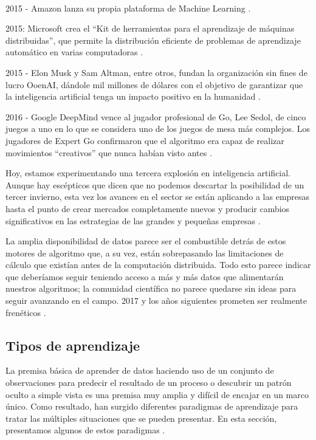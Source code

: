 \\ \par
2015 - Amazon lanza su propia plataforma de Machine Learning \cite{V.Gonzalez}.
\\ \par
2015: Microsoft crea el ``Kit de herramientas para el aprendizaje de máquinas distribuidas'', que permite la distribución eficiente de problemas de aprendizaje automático en varias computadoras \cite{V.Gonzalez}.
\\ \par
2015 - Elon Musk y Sam Altman, entre otros, fundan la organización sin fines de lucro OoenAI, dándole mil millones de dólares con el objetivo de garantizar que la inteligencia artificial tenga un impacto positivo en la humanidad \cite{V.Gonzalez}.
\\ \par
2016 - Google DeepMind vence al jugador profesional de Go, Lee Sedol, de cinco juegos a uno en lo que se considera uno de los juegos de mesa más complejos. Los jugadores de Expert Go confirmaron que el algoritmo era capaz de realizar movimientos ``creativos'' que nunca habían visto antes \cite{V.Gonzalez}.
\\ \par
Hoy, estamos experimentando una tercera explosión en inteligencia artificial. Aunque hay escépticos que dicen que no podemos descartar la posibilidad de un tercer invierno, esta vez los avances en el sector se están aplicando a las empresas hasta el punto de crear mercados completamente nuevos y producir cambios significativos en las estrategias de las grandes y pequeñas empresas \cite{V.Gonzalez}.
\\ \par
La amplia disponibilidad de datos parece ser el combustible detrás de estos motores de algoritmo que, a su vez, están sobrepasando las limitaciones de cálculo que existían antes de la computación distribuida. Todo esto parece indicar que deberíamos seguir teniendo acceso a más y más datos que alimentarán nuestros algoritmos; la comunidad científica no parece quedarse sin ideas para seguir avanzando en el campo. 2017 y los años siguientes prometen ser realmente frenéticos \cite{V.Gonzalez}.
\\ \par 
\subsection{Tipos de aprendizaje}
La premisa básica de aprender de datos haciendo uso de un conjunto de observaciones para predecir el resultado de un proceso o descubrir un patrón oculto a simple vista es una premisa muy amplia y difícil de encajar en un marco único. Como resultado, han surgido diferentes paradigmas de aprendizaje para tratar las múltiples situaciones que se pueden presentar. En esta sección, presentamos algunos de estos paradigmas \cite{Mostafa}.
\\
